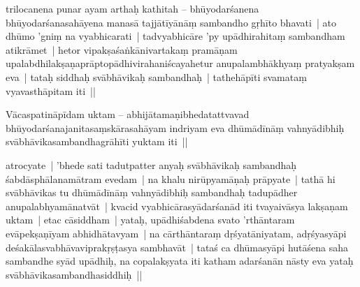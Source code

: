 \documentclass[article,12pt,a4paper]{memoir}%
\newcommand{\persName}[1]{#1}
\newcounter{parCount}
\begin{document}
	  
	  \pstart \leavevmode%
	\label{thakur75-46.27}\persName{trilocanena} punar ayam arthaḥ kathitah – \label{sarit__ratnakīrtinibandhāvali__125156}bhūyodarśanena bhūyodarśanasahāyena manasā tajjātīyānāṃ sambandho gṛhīto bhavati | ato dhūmo 'gniṃ na vyabhicarati | tadvyabhicāre 'py upādhirahitaṃ sambandham atikrāmet | hetor vipakṣaśaṅkānivartakaṃ pramāṇam upalabdhilakṣaṇaprāptopādhivirahaniścayahetur anupalambhākhyaṃ pratyakṣam eva | tataḥ siddhaḥ svābhāvikaḥ sambandhaḥ | tathehāpīti svamataṃ vyavasthāpitam iti ||\label{sarit__ratnakīrtinibandhāvali__125583}
	{}
	\pend%
      

	  
	  \pstart \leavevmode%
	\label{thakur75-47.1}Vācaspatināpīdam uktam – abhijātamaṇibhedatattvavad bhūyodarśanajanitasaṃskārasahāyam indriyam eva dhūmādīnāṃ vahnyādibhiḥ svābhāvikasambandhagrāhīti yuktam iti ||
	{}
	\pend%
      

	  
	  \pstart \leavevmode%
	\label{thakur75-47.3}atrocyate | \label{ratnakīrtinibandhāvali__36r1PF7IMVLODEE7RZ9HXOTB6GW}'bhede\label{ratnakīrtinibandhāvali__36r1PF7IMVKUPK1QFXFUAIMYDBD} sati tadutpatter anyaḥ svābhāvikaḥ sambandhaḥ śabdāsphālanamātram evedam | na khalu nirūpyamāṇaḥ prāpyate | tathā hi svābhāvikas tu dhūmādīnāṃ vahnyādibhiḥ sambandhaḥ tadupādher anupalabhyamānatvāt | kvacid vyabhicārasyādarśanād iti tvayaivāsya lakṣaṇam uktam | etac cāsiddham | yataḥ, upādhiśabdena svato 'rthāntaram evāpekṣaṇīyam abhidhātavyam | na cārthāntaraṃ dṛśyatāniyatam, adṛśyasyāpi deśakālasvabhāvaviprakṛṣṭasya sambhavāt | tataś ca dhūmasyāpi hutāśena saha sambandhe syād upādhiḥ, na copalakṣyata iti katham adarśanān nāsty eva yataḥ svābhāvikasambandhasiddhiḥ ||
	{}
	\pend%
      
\end{document}
